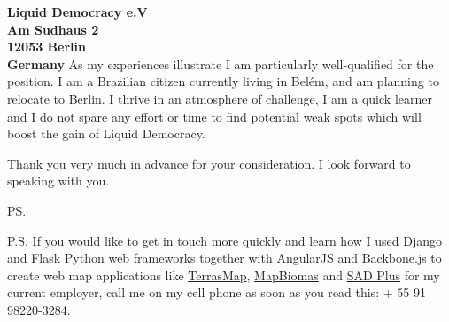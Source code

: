 \documentclass[a4paper]{joaosoares-letter}
\begin{document}
\begin{letter}{\bfseries Liquid Democracy e.V\\Am Sudhaus 2\\12053 Berlin\\Germany}
As my experiences illustrate I am particularly well-qualified for the position. I am a Brazilian citizen currently living in Belém, and am planning to relocate to Berlin. I thrive in an atmosphere of challenge, I am a quick learner and I do not spare any effort or time to find potential weak spots which will boost the gain of Liquid Democracy.

\closing{Thank you very much in advance for your consideration. I look forward to speaking with you.}
\vspace{10pt}
\ps


P.S. If you would like to get in touch more quickly and learn how I used Django and Flask Python web frameworks together with AngularJS and Backbone.js to create web map applications like \href{https://goo.gl/6gUzPA}{TerrasMap}, \href{https://goo.gl/eYX5SW}{MapBiomas} and \href{https://goo.gl/2J41hR}{SAD Plus} for my current employer, call me on my cell phone as soon as you read this: + 55 91 98220-3284.
\vspace{\fill}

\end{letter}
\end{document}
